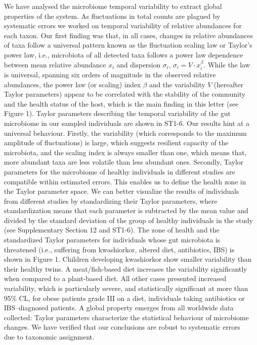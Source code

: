 We have analysed the microbiome temporal variability to extract global properties of the system. As fluctuations in total counts are plagued by systematic errors we worked on temporal variability of relative abundances for each taxon. Our first finding was that, in all cases, changes in relative abundances of taxa follow a universal pattern known as the fluctuation scaling law\cite{fs} or Taylor's  power law\cite{taylor}, i.e., microbiota of all detected taxa follows a power law dependence between mean relative abundance $x_i$ and dispersion $\sigma_i$, $\sigma_i  = V\cdot x_i^{\beta}$. While the law is universal, spanning six orders of magnitude in the observed relative abundances, the power law (or scaling) index $\beta$ and the variability $V$ (hereafter Taylor parameters) appear to be correlated with the stability of the community and the health status of the host, which is the main finding in this letter (see Figure 1). Taylor parameters describing the temporal variability of the gut microbiome in our sampled individuals are shown in ST1-6. Our results hint at a universal behaviour. Firstly, the variability (which corresponds to the maximum amplitude of fluctuations) is large, which suggests resilient capacity of the microbiota, and the scaling index is always smaller than one, which means that, more abundant taxa are less volatile than less abundant ones. Secondly, Taylor parameters for the microbiome of healthy individuals in different studies are compatible within estimated errors. This enables us to define the health zone in the Taylor parameter space. We can better visualize the results of individuals from different studies by standardizing their Taylor parameters, where standardization means that each parameter is subtracted by the mean value and divided by the standard deviation of the group of healthy individuals in the study (see Supplementary Section 12 and ST1-6). The zone of health and the standardized Taylor parameters for individuals whose gut microbiota is threatened (i.e., suffering from kwashiorkor, altered diet, antibiotics, IBS) is shown in Figure 1. Children developing kwashiorkor show smaller variability than their healthy twins. A meat/fish-based diet increases the variability significantly when compared to a plant-based diet. All other cases presented increased variability, which is particularly severe, and statistically significant at more than 95\% CL, for obese patients grade III on a diet, individuals taking antibiotics or IBS--diagnosed patients. A global property emerges from all worldwide data collected: Taylor parameters characterize the statistical behaviour of microbiome changes. We have verified that our conclusions are robust to systematic errors due to taxonomic assignment.

